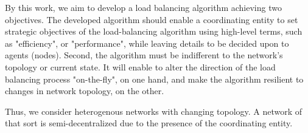 By this work, we aim to develop a load balancing algorithm achieving two objectives.
The developed algorithm should enable a coordinating entity to set strategic objectives of the load-balancing algorithm using high-level terms, such as "efficiency", or "performance", while leaving details to be decided upon to agents (nodes).
Second, the algorithm must be indifferent to the network's topology or current state. It will enable to alter the direction of the load balancing process "on-the-fly", on one hand, and make the algorithm resilient to changes in network topology, on the other.

Thus, we consider heterogenous networks with changing topology. A network of that sort is semi-decentralized due to the presence of the coordinating entity.
